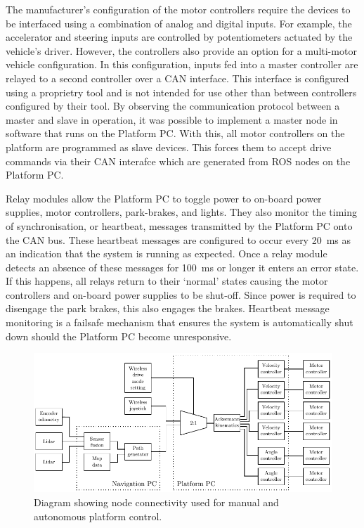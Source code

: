 \documentclass[preprint,authoryear,12pt]{elsarticle}
\begin{document}
        The manufacturer's configuration of the motor controllers require the devices to be interfaced using a combination of analog and digital inputs.
        For example, the accelerator and steering inputs are controlled by potentiometers actuated by the vehicle's driver.
        However, the controllers also provide an option for a multi-motor vehicle configuration.
        In this configuration, inputs fed into a master controller are relayed to a second controller over a CAN interface.
        This interface is configured using a proprietry tool and is not intended for use other than between controllers configured by their tool.
        By observing the communication protocol between a master and slave in operation, it was possible to implement a master node in software that runs on the Platform PC.
        With this, all motor controllers on the platform are programmed as slave devices.
        This forces them to accept drive commands via their CAN interafce which are generated from ROS nodes on the Platform PC.

        Relay modules allow the Platform PC to toggle power to on-board power supplies, motor controllers, park-brakes, and lights.
        They also monitor the timing of synchronisation, or heartbeat, messages transmitted by the Platform PC onto the CAN bus.
        These heartbeat messages are configured to occur every \SI{20}{\milli\second} as an indication that the system is running as expected.
        Once a relay module detects an absence of these messages for \SI{100}{\milli\second} or longer it enters an error state.
        If this happens, all relays return to their `normal' states causing the motor controllers and on-board power supplies to be shut-off.
        Since power is required to disengage the park brakes, this also engages the brakes.
        Heartbeat message monitoring is a failsafe mechanism that ensures the system is automatically shut down should the Platform PC become unresponsive.

        \begin{figure}[htb]
            \centering
            \includegraphics[width=\linewidth]{imgs/system_diagram/software_v2.pdf}
            \caption{Diagram showing node connectivity used for manual and autonomous platform control.}
            \label{fig:system_diagram_software}
        \end{figure}
\end{document}
